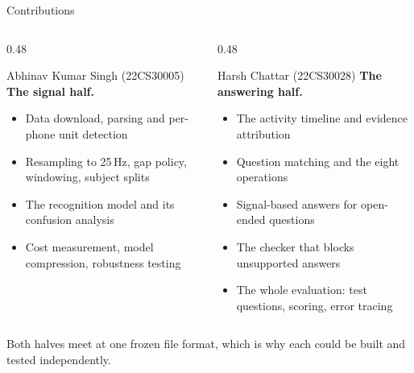 \documentclass[aspectratio=169,11pt]{beamer}
\begin{document}
\begin{frame}{Contributions}
  \centering
  \begin{columns}[T,onlytextwidth]
    \begin{column}{0.48\textwidth}
      \begin{block}{Abhinav Kumar Singh (22CS30005)}
        \footnotesize
        \textbf{The signal half.}
        \begin{itemize}
          \item Data download, parsing and per-phone unit detection
          \item Resampling to 25\,Hz, gap policy, windowing, subject splits
          \item The recognition model and its confusion analysis
          \item Cost measurement, model compression, robustness testing
        \end{itemize}
      \end{block}
    \end{column}
    \begin{column}{0.48\textwidth}
      \begin{block}{Harsh Chattar (22CS30028)}
        \footnotesize
        \textbf{The answering half.}
        \begin{itemize}
          \item The activity timeline and evidence attribution
          \item Question matching and the eight operations
          \item Signal-based answers for open-ended questions
          \item The checker that blocks unsupported answers
          \item The whole evaluation: test questions, scoring, error tracing
        \end{itemize}
      \end{block}
    \end{column}
  \end{columns}

  \vspace{0.5em}
  {\footnotesize Both halves meet at one frozen file format, which is why each
  could be built and tested independently.}
\end{frame}
\end{document}
